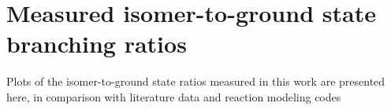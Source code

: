 % 
% 


% 
% 
\section{Measured isomer-to-ground state branching ratios } \label{sec:fe_ibr_figures}

Plots of the isomer-to-ground state ratios measured in this work are presented here, in comparison with literature data and reaction modeling codes 





     

